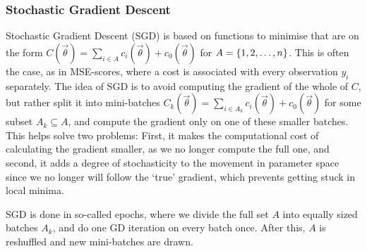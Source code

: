     \subsubsection{Stochastic Gradient Descent} 
        Stochastic Gradient Descent (SGD) is based on functions to minimise that are on the form $C(\vec{\theta}) = \sum_{i \in A} c_i(\vec{\theta}) + c_0(\vec{\theta})$ for $A=\left\{1,2,\ldots,n\right\}$. This is often the case, as in MSE-scores, where a cost is associated with every observation $y_i$ separately. The idea of SGD is to avoid computing the gradient of the whole of $C$, but rather split it into mini-batches $C_k(\vec{\theta}) = \sum_{i\in A_k} c_i(\vec{\theta}) + c_0(\vec{\theta})$ for some subset $A_k \subseteq A$, and compute the gradient only on one of these smaller batches. This helps solve two problems: First, it makes the computational cost of calculating the gradient smaller, as we no longer compute the full one, and second, it adds a degree of stochasticity to the movement in parameter space since we no longer will follow the `true' gradient, which prevents getting stuck in local minima.

        SGD is done in so-called epochs, where we divide the full set $A$ into equally sized batches $A_k$, and do one GD iteration on every batch once. After this, $A$ is reshuffled and new mini-batches are drawn.

